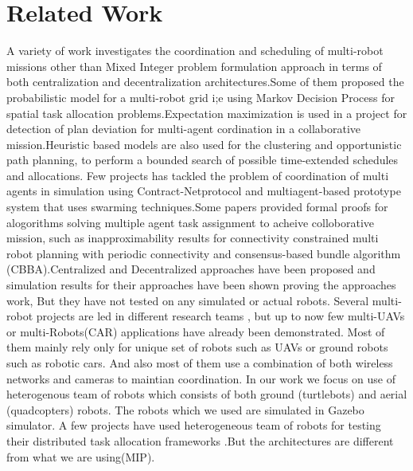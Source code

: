 \documentclass[conference]{IEEEtran}
\begin{document}
\section{Related Work}
A variety of work investigates the coordination and scheduling of multi-robot missions other than Mixed Integer problem formulation approach in terms of both centralization and decentralization architectures.Some of them proposed the probabilistic model for a multi-robot grid i;e using Markov Decision Process for spatial task allocation problems\cite{claes2015effective}\cite{di2011decentralized}\cite{ponda2015cooperative}.Expectation maximization is used in a project for detection of plan deviation for multi-agent cordination in a collaborative mission\cite{claes2015effective}\cite{banerjee2016detection}.Heuristic based models are also used for the clustering and opportunistic path planning, to perform a bounded search of possible time-extended schedules and allocations\cite{jones2011time}\cite{maza2011distributed}\cite{jones2011time}.
 Few projects has tackled the problem of coordination of multi agents in simulation using Contract-Netprotocol\cite{lemaire2004distributed} and multiagent-based prototype system that uses swarming techniques\cite{dasgupta2008multiagent}.Some papers provided formal proofs for alogorithms solving multiple agent task assignment to acheive colloborative mission, such as inapproximability results for connectivity constrained multi robot planning with periodic connectivity\cite{hollinger2012multirobot} and consensus-based bundle algorithm (CBBA)\cite{choi2009consensus}\cite{ponda2010decentralized}.Centralized and Decentralized approaches have been proposed and simulation results for their approaches have been shown proving the approaches work, But they have not tested on any simulated or actual robots\cite{feo2016decentralized}\cite{flushing2014mathematical}\cite{galceran2013survey}.
Several multi-robot projects are led in different research teams , but up to now few multi-UAVs or multi-Robots(CAR) applications have already been demonstrated\cite{gancet2005task}\cite{garzon2016multirobot}. Most of them mainly rely only for unique set of robots such as UAVs or ground robots such as robotic cars. And also most of them use a combination of both wireless networks and cameras to maintian coordination. In our work we focus on use of heterogenous team of robots which consists of both ground (turtlebots) and aerial (quadcopters) robots. The robots which we used are simulated in Gazebo simulator. A few projects have used heterogeneous team of robots for testing their  distributed task allocation frameworks \cite{ponda2010decentralized} \cite{sariel2011generic}\cite{shiroma2009comutar}.But the architectures are different from what we are using(MIP). 
\end{document}
